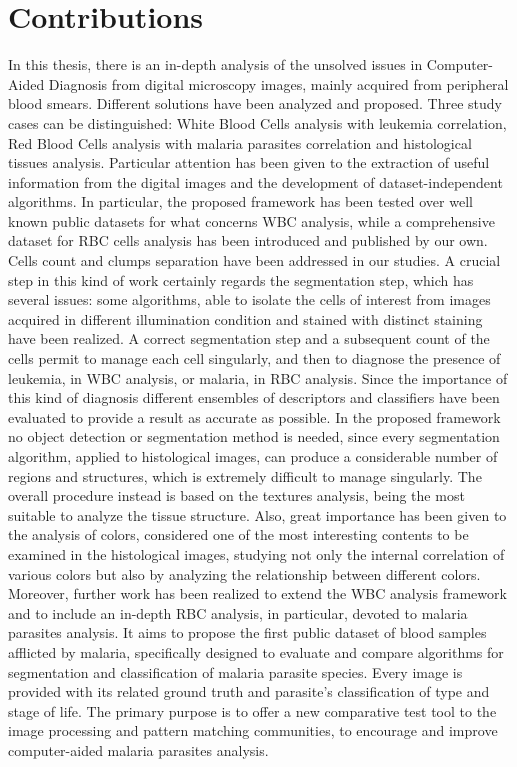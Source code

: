 \documentclass[final,a4paper,12pt,english]{UnicaPhdThesis3}
\begin{document}
\section{Contributions} 
In this thesis, there is an in-depth analysis of the unsolved issues in Computer-Aided Diagnosis from digital microscopy images, mainly acquired from peripheral blood smears. Different solutions have been analyzed and proposed. Three study cases can be distinguished: White Blood Cells analysis with leukemia correlation, Red Blood Cells analysis with malaria parasites correlation and histological tissues analysis. Particular attention has been given to the extraction of useful information from the digital images and the development of dataset-independent algorithms. In particular, the proposed framework has been tested over well known public datasets for what concerns WBC analysis, while a comprehensive dataset for RBC cells analysis has been introduced and published by our own. Cells count and clumps separation have been addressed in our studies. A crucial step in this kind of work certainly regards the segmentation step, which has several issues: some algorithms, able to isolate the cells of interest from images acquired in different illumination condition and stained with distinct staining have been realized. A correct segmentation step and a subsequent count of the cells permit to manage each cell singularly, and then to diagnose the presence of leukemia, in WBC analysis, or malaria, in RBC analysis. Since the importance of this kind of diagnosis different ensembles of descriptors and classifiers have been evaluated to provide a result as accurate as possible. In the proposed framework no object detection or segmentation method is needed, since every segmentation algorithm, applied to histological images, can produce a considerable number of regions and structures, which is extremely difficult to manage singularly. The overall procedure instead is based on the textures analysis, being the most suitable to analyze the tissue structure. Also, great importance has been given to the analysis of colors, considered one of the most interesting contents to be examined in the histological images, studying not only the internal correlation of various colors but also by analyzing the relationship between different colors.
Moreover, further work has been realized to extend the WBC analysis framework and to include an in-depth RBC analysis, in particular, devoted to malaria parasites analysis. It aims to propose the first public dataset of blood samples afflicted by malaria, specifically designed to evaluate and compare algorithms for segmentation and classification of malaria parasite species. Every image is provided with its related ground truth and parasite’s classification of type and stage of life. The primary purpose is to offer a new comparative test tool to the image processing and pattern matching communities, to encourage and improve computer-aided malaria parasites analysis.
\end{document}
